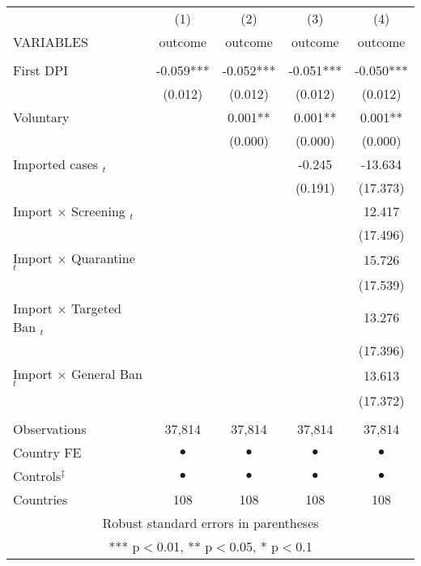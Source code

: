 \begin{tabular}{lcccc} \hline
 & (1) & (2) & (3) & (4) \\
VARIABLES & outcome & outcome & outcome & outcome \\ \hline
 &  &  &  &  \\
First DPI & -0.059*** & -0.052*** & -0.051*** & -0.050*** \\
 & (0.012) & (0.012) & (0.012) & (0.012) \\
Voluntary &  & 0.001** & 0.001** & 0.001** \\
 &  & (0.000) & (0.000) & (0.000) \\
Imported cases $ _{ t}$ &  &  & -0.245 & -13.634 \\
 &  &  & (0.191) & (17.373) \\
Import $ \times $ Screening $ _{ t}$ &  &  &  & 12.417 \\
 &  &  &  & (17.496) \\
Import $ \times $ Quarantine $ _{ t}$ &  &  &  & 15.726 \\
 &  &  &  & (17.539) \\
Import $ \times $ Targeted Ban $ _{ t}$ &  &  &  & 13.276 \\
 &  &  &  & (17.396) \\
Import $ \times $ General Ban $ _{ t}$ &  &  &  & 13.613 \\
 &  &  &  & (17.372) \\
 &  &  &  &  \\
Observations & 37,814 & 37,814 & 37,814 & 37,814 \\
Country FE & $ \bullet $ & $ \bullet $ & $ \bullet $ & $ \bullet $ \\
Controls$^\ddag$ & $ \bullet $ & $ \bullet $ & $ \bullet $ & $ \bullet $ \\
 Countries & 108 & 108 & 108 & 108 \\ \hline
\multicolumn{5}{c}{ Robust standard errors in parentheses} \\
\multicolumn{5}{c}{ *** p$<$0.01, ** p$<$0.05, * p$<$0.1} \\
\end{tabular}
